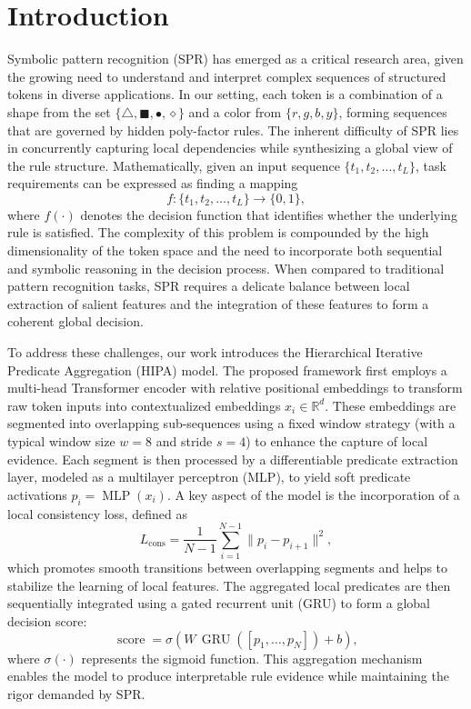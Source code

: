 \documentclass[11pt]{article}
\begin{document}
\section{Introduction}
Symbolic pattern recognition (SPR) has emerged as a critical research area, given the growing need to understand and interpret complex sequences of structured tokens in diverse applications. In our setting, each token is a combination of a shape from the set $\{\triangle, \blacksquare, \bullet, \diamond\}$ and a color from $\{r, g, b, y\}$, forming sequences that are governed by hidden poly-factor rules. The inherent difficulty of SPR lies in concurrently capturing local dependencies while synthesizing a global view of the rule structure. Mathematically, given an input sequence $\{t_1, t_2, \dots, t_L\}$, task requirements can be expressed as finding a mapping 
\[
f: \{t_1, t_2, \dots, t_L\} \to \{0,1\},
\]
where $f(\cdot)$ denotes the decision function that identifies whether the underlying rule is satisfied. The complexity of this problem is compounded by the high dimensionality of the token space and the need to incorporate both sequential and symbolic reasoning in the decision process. When compared to traditional pattern recognition tasks, SPR requires a delicate balance between local extraction of salient features and the integration of these features to form a coherent global decision.

To address these challenges, our work introduces the Hierarchical Iterative Predicate Aggregation (HIPA) model. The proposed framework first employs a multi-head Transformer encoder with relative positional embeddings to transform raw token inputs into contextualized embeddings $x_i\in\mathbb{R}^d$. These embeddings are segmented into overlapping sub-sequences using a fixed window strategy (with a typical window size $w=8$ and stride $s=4$) to enhance the capture of local evidence. Each segment is then processed by a differentiable predicate extraction layer, modeled as a multilayer perceptron (MLP), to yield soft predicate activations $p_i=\operatorname{MLP}(x_i)$. A key aspect of the model is the incorporation of a local consistency loss, defined as
\[
L_{\text{cons}}=\frac{1}{N-1}\sum_{i=1}^{N-1}\|p_i-p_{i+1}\|^2,
\]
which promotes smooth transitions between overlapping segments and helps to stabilize the learning of local features. The aggregated local predicates are then sequentially integrated using a gated recurrent unit (GRU) to form a global decision score:
\[
\operatorname{score}=\sigma\left(W\,\operatorname{GRU}([p_1,\dots,p_N])+b\right),
\]
where $\sigma(\cdot)$ represents the sigmoid function. This aggregation mechanism enables the model to produce interpretable rule evidence while maintaining the rigor demanded by SPR.
\end{document}
